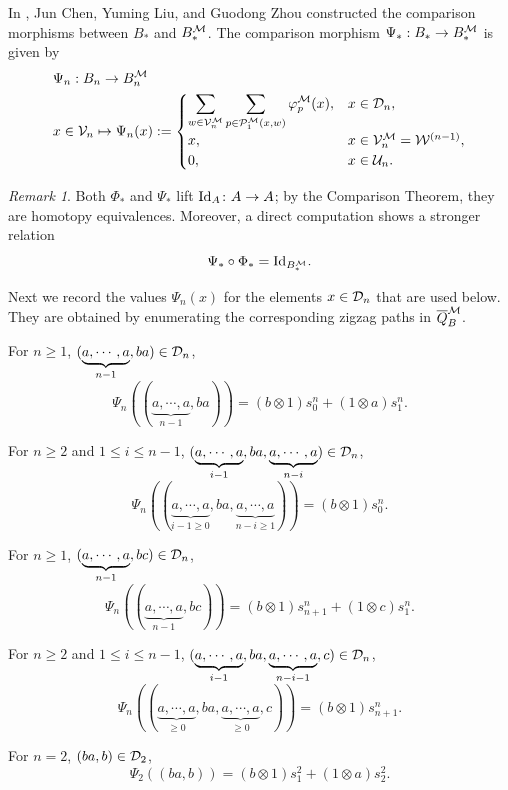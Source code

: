 \documentclass[10pt, reqno]{amsart}
\theoremstyle{definition}
\theoremstyle{remark}
\newtheorem{remark}[theorem]{Remark}
\numberwithin{equation}{section}
\begin{document}
In \cite[Theorem 3.3]{CLZ24}, Jun Chen, Yuming Liu, and Guodong Zhou constructed the comparison morphisms between $B_*$ and $B_*^{\mathcal{M}}$. The comparison morphism $\Psi_*:B_*\to B_*^{\mathcal{M}}$ is given by
\[
\begin{aligned}
& \Psi_n : B_n \to B_n^{\mathcal{M}} \\
& x \in \mathcal{V}_n\mapsto \Psi_n(x) := 
\begin{cases} 
\displaystyle \sum_{w \in \mathcal{V}_n^{\mathcal{M}}} \sum_{p \in \mathcal{P}_1^{\mathcal{M}}(x,w)} \varphi_p^{\mathcal{M}}(x), & x \in \mathcal{D}_n, \\
x, & x \in \mathcal{V}_n^{\mathcal{M}}=\mathcal{W}^{(n-1)}, \\
0, & x \in \mathcal{U}_n. 
\end{cases}
\end{aligned}
\]

\begin{remark}
Both \(\Phi_*\) and \(\Psi_*\) lift \(\mathrm{Id}_A\colon A \to A\); by the Comparison Theorem, they are homotopy equivalences.
Moreover, a direct computation shows a stronger relation
\[
\Psi_* \circ \Phi_*= \mathrm{Id}_{B_*^{\mathcal{M}}}.
\]
\end{remark}
 Next we record the values \(\Psi_n(x)\) for the elements \(x\in \mathcal{D}_n\) that are used below. They are obtained by enumerating the corresponding
zigzag paths in $\overline Q_B^{\mathcal{M}}$.

For \(n\ge 1\), \((\underbrace{a,\cdots,a}_{n-1},ba)\in \mathcal{D}_n\),
\[ \Psi_n((\underbrace{a,\cdots,a}_{n-1},ba))=(b\otimes1)s_0^n+(1\otimes a)s_1^n.\]

For \(n\ge 2\) and \(1\le i\le n-1\), \((\underbrace{a,\cdots,a}_{i-1},ba,\underbrace{a,\cdots,a}_{n-i})\in \mathcal{D}_n\),
\[ \Psi_n((\underbrace{a,\cdots,a}_{i-1\ge 0},ba,\underbrace{a,\cdots,a}_{n-i\ge 1}))=(b\otimes1)s_0^n.\]

For \(n\ge 1\), \((\underbrace{a,\cdots,a}_{n-1}, bc)\in \mathcal{D}_n\),
\[ \Psi_n((\underbrace{a,\cdots,a}_{n-1}, bc))=(b\otimes1)s_{n+1}^n+ (1\otimes c)s_1^n.\]

For \(n\ge 2\) and \( 1\le i\le n-1\), \((\underbrace{a,\cdots,a}_{i-1},ba,\underbrace{a,\cdots,a}_{n-i-1},c)\in \mathcal{D}_n\),
\[ \Psi_n((\underbrace{a,\cdots,a}_{\ge 0},ba,\underbrace{a,\cdots,a}_{\ge 0},c))=(b\otimes1)s_{n+1}^n.\]


For \(n=2\), \((ba,b)\in \mathcal{D}_2\),
\[ \Psi_2((ba,b))=(b\otimes 1)s_1^2+(1\otimes a)s_2^2.\]

\end{document}
